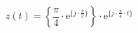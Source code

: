\[
z(t) =  \left \{ \frac{\pi}{4} \cdot \textrm{e}^{\{ j \cdot \frac{\pi}{2} \}} \right \} \cdot \textrm{e}^{\{ j \cdot \frac{\pi}{4} \cdot t \}}
\]
